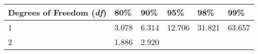 \documentclass[]{book}
\begin{document}
\begin{longtable}[]{@{}llllll@{}}
\toprule
\begin{minipage}[b]{0.32\columnwidth}\raggedright
Degrees of Freedom (\emph{df})\strut
\end{minipage} & \begin{minipage}[b]{0.09\columnwidth}\raggedright
80\%\strut
\end{minipage} & \begin{minipage}[b]{0.09\columnwidth}\raggedright
90\%\strut
\end{minipage} & \begin{minipage}[b]{0.10\columnwidth}\raggedright
95\%\strut
\end{minipage} & \begin{minipage}[b]{0.14\columnwidth}\raggedright
98\%\strut
\end{minipage} & \begin{minipage}[b]{0.10\columnwidth}\raggedright
99\%\strut
\end{minipage}\tabularnewline
\midrule
\endhead
\begin{minipage}[t]{0.32\columnwidth}\raggedright
1\strut
\end{minipage} & \begin{minipage}[t]{0.09\columnwidth}\raggedright
3.078\strut
\end{minipage} & \begin{minipage}[t]{0.09\columnwidth}\raggedright
6.314\strut
\end{minipage} & \begin{minipage}[t]{0.10\columnwidth}\raggedright
12.706\strut
\end{minipage} & \begin{minipage}[t]{0.14\columnwidth}\raggedright
31.821\strut
\end{minipage} & \begin{minipage}[t]{0.10\columnwidth}\raggedright
63.657\strut
\end{minipage}\tabularnewline
\begin{minipage}[t]{0.32\columnwidth}\raggedright
2\strut
\end{minipage} & \begin{minipage}[t]{0.09\columnwidth}\raggedright
1.886\strut
\end{minipage} & \begin{minipage}[t]{0.09\columnwidth}\raggedright
2.920\strut
\end{minipage} & \begin{minipage}[t]{0.10\columnwidth}\raggedright

\end{minipage}
\end{longtable}
\end{document}
